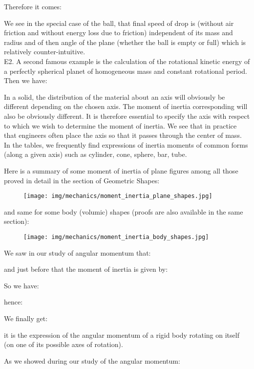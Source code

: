 	\begin{tcolorbox}[colframe=black,colback=white,sharp corners]
	
	Therefore it comes:
	
	We see in the special case of the ball, that final speed of drop is (without air friction and without energy loss due to friction) independent of its mass and radius and of then angle of the plane (whether the ball is empty or full) which is relatively counter-intuitive.\\
	
	E2. A second famous example is the calculation of the rotational kinetic energy of a perfectly spherical planet of homogeneous mass and constant rotational period. Then we have:
	
	\end{tcolorbox}
	In a solid, the distribution of the material about an axis will obviously be different depending on the chosen axis. The moment of inertia corresponding will also be obviously different. It is therefore essential to specify the axis with respect to which we wish to determine the moment of inertia. We see that in practice that engineers often place the axis so that it passes through the center of mass. In the tables, we frequently find expressions of inertia moments of common forms (along a given axis) such as cylinder, cone, sphere, bar, tube.
	
	Here is a summary of some moment of inertia of plane figures among all those proved in detail in the section of Geometric Shapes:
	\begin{figure}[H]
		\centering
		\texttt{[image: img/mechanics/moment\_inertia\_plane\_shapes.jpg]}
	\end{figure}
	and same for some body (volumic) shapes (proofs are also available in the same section):
	\begin{figure}[H]
		\centering
		\texttt{[image: img/mechanics/moment\_inertia\_body\_shapes.jpg]}
	\end{figure}
	We saw in our study of angular momentum that:
	
	and just before that the moment of inertia is given by:
	
	So we have:
	
	hence:
	
	We finally get:
	
	it is the expression of the angular momentum of a rigid body rotating on itself (on one of its possible axes of rotation).
	
	As we showed during our study of the angular momentum:
	
